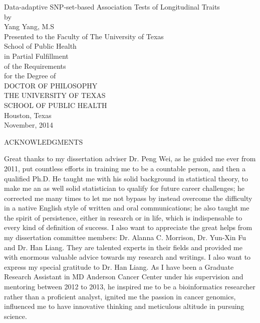\documentclass[12pt]{article}
\begin{document}
\newpage
\thispagestyle{empty}
\doublespacing
\begin{center}
{\normalsize Data-adaptive SNP-set-based Association Tests of Longitudinal Traits }\\[3.2cm]

by\\[0.5cm]

Yang Yang, M.S\\[3.2cm]

Presented to the Faculty of The University of Texas\\
School of Public Health\\
in Partial Fulfillment\\
of the Requirements\\
for the Degree of\\[1.5cm]
DOCTOR OF PHILOSOPHY\\[1.5cm]
\singlespacing
THE UNIVERSITY OF TEXAS\\
SCHOOL OF PUBLIC HEALTH\\
Houston, Texas\\
November, 2014
\end{center}


\newpage
\thispagestyle{empty}
\doublespacing
\begin{center}
ACKNOWLEDGMENTS
\end{center}
Great thanks to my dissertation adviser Dr. Peng Wei, as he guided me ever from 2011, put countless efforts in training me to be a countable person, and then a qualified Ph.D. He taught me with his solid background in statistical theory, to make me an as well solid statistician to qualify for future career challenges; he corrected me many times to let me not bypass by instead overcome the difficulty in a native English style of written and oral communications; he also taught me the spirit of persistence, either in research or in life, which is indispensable to every kind of definition of success. I also want to appreciate the great helps from my dissertation committee members: Dr. Alanna C. Morrison, Dr. Yun-Xin Fu and Dr. Han Liang. They are talented experts in their fields and provided me with enormous valuable advice towards my research and writings. I also want to express my special gratitude to Dr. Han Liang. As I have been a Graduate Research Assistant in MD Anderson Cancer Center under his supervision and mentoring between 2012 to 2013, he inspired me to be a bioinformatics researcher rather than a proficient analyst, ignited me the passion in cancer genomics, influenced me to have innovative thinking and meticulous altitude in pursuing science.
\end{document}
